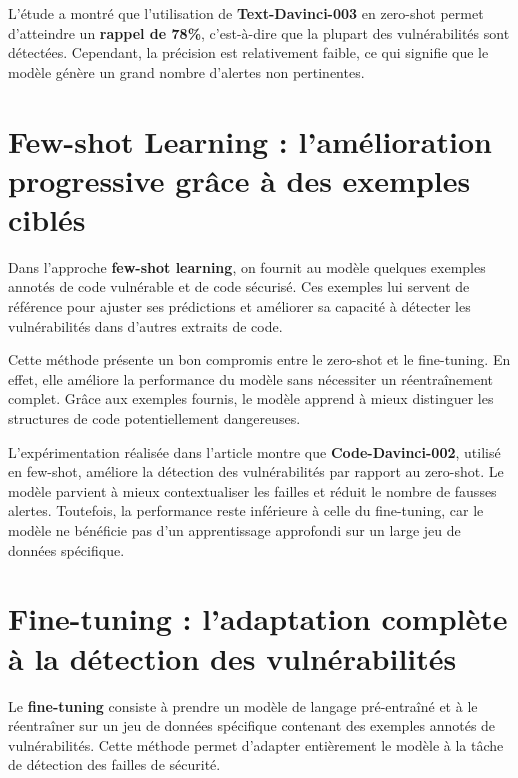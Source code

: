 L’étude a montré que l’utilisation de \textbf{Text-Davinci-003}
en zero-shot permet d’atteindre un \textbf{rappel de 78\%}, c’est-à-dire que la
plupart des vulnérabilités sont détectées. Cependant, la précision est
relativement faible, ce qui signifie que le modèle génère un grand nombre
d’alertes non pertinentes.



\section{Few-shot Learning :
l’amélioration progressive grâce à des exemples ciblés}



Dans l’approche \textbf{few-shot learning},
on fournit au modèle quelques exemples annotés de code vulnérable et de code
sécurisé. Ces exemples lui servent de référence pour ajuster ses prédictions et
améliorer sa capacité à détecter les vulnérabilités dans d’autres extraits de
code.



Cette méthode présente un bon compromis
entre le zero-shot et le fine-tuning. En effet, elle améliore la performance du
modèle sans nécessiter un réentraînement complet. Grâce aux exemples fournis,
le modèle apprend à mieux distinguer les structures de code potentiellement
dangereuses.



L’expérimentation réalisée dans l’article
montre que \textbf{Code-Davinci-002}, utilisé en few-shot, améliore la détection
des vulnérabilités par rapport au zero-shot. Le modèle parvient à mieux
contextualiser les failles et réduit le nombre de fausses alertes. Toutefois,
la performance reste inférieure à celle du fine-tuning, car le modèle ne
bénéficie pas d’un apprentissage approfondi sur un large jeu de données
spécifique.



\section{Fine-tuning : l’adaptation
complète à la détection des vulnérabilités}



Le \textbf{fine-tuning} consiste à prendre un
modèle de langage pré-entraîné et à le réentraîner sur un jeu de données
spécifique contenant des exemples annotés de vulnérabilités. Cette méthode
permet d’adapter entièrement le modèle à la tâche de détection des failles de
sécurité.



